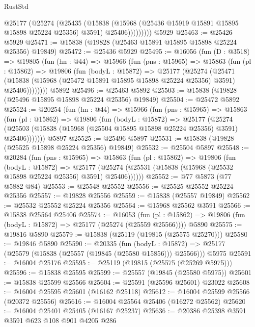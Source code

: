 \begin{lexlean}{RustStd}
\begin{coremodule}
              @25177
                (@25274
                  (@25435
                    (@15838
                      (@15968 (@25436 @15919 @15891 @15895 @15898 @25224 @25356) @3591)
                      @25406)))))))))
    @5929
@25463 := @25426 @5929
@25471 := @15838 (@19828 (@25463 @15891 @15895 @15898 @25224 @25356) @19849)
@25472 := @25436 @5929
@25495 := @16056
    (fun (D : @3518) =>
    @19805
      (fun (hn : @44) =>
      @15966
        (fun (pns : @15965) =>
        @15863
          (fun (pl : @15862) =>
          @19806
            (fun (bodyL : @15872) =>
            @25177
              (@25274
                (@25471
                  (@15838 (@15968 (@25472 @15891 @15895 @15898 @25224 @25356) @3591) @25406))))))))
    @5892
@25496 := @25463 @5892
@25503 := @15838 (@19828 (@25496 @15895 @15898 @25224 @25356) @19849)
@25504 := @25472 @5892
@25524 := @20254
    (fun (hn : @44) =>
    @15966
      (fun (pns : @15965) =>
      @15863
        (fun (pl : @15862) =>
        @19806
          (fun (bodyL : @15872) =>
          @25177
            (@25274
              (@25503 (@15838 (@15968 (@25504 @15895 @15898 @25224 @25356) @3591) @25406)))))))
    @5897
@25525 := @25496 @5897
@25531 := @15838 (@19828 (@25525 @15898 @25224 @25356) @19849)
@25532 := @25504 @5897
@25548 := @20284
    (fun (pns : @15965) =>
    @15863
      (fun (pl : @15862) =>
      @19806
        (fun (bodyL : @15872) =>
        @25177 (@25274 (@25531 (@15838 (@15968 (@25532 @15898 @25224 @25356) @3591) @25406))))))
@25552 := @77 @5873 (@77 @5882 @84)
@25553 := @25548 @25552
@25556 := @25525 @25552 @25224 @25356
@25557 := @19828 @25556
@25559 := @15838 (@25557 @19849)
@25562 := @25532 @25552 @25224 @25356
@25564 := @15968 @25562 @3591
@25566 := @15838 @25564 @25406
@25574 := @16053
    (fun (pl : @15862) => @19806 (fun (bodyL : @15872) => @25177 (@25274 (@25559 @25566))))
    @5890
@25575 := @19816 @5890
@25579 := @15838 (@25119 (@19815 (@25575 @25270)))
@25580 := @19846 @5890
@25590 := @20335
    (fun (bodyL : @15872) => @25177 (@25579 (@15838 (@25557 (@19845 (@25580 @15856))) @25566)))
    @5975
@25591 := @16004 @25176
@25595 := @25119 (@19815 (@25575 (@25269 @5975)))
@25596 := @15838 @25595
@25599 := @25557 (@19845 (@25580 @5975))
@25601 := @15838 @25599 @25566
@25604 := @25591 (@25596 @25601) @23022
@25608 := @16004 @25595 @25601 (@16162 @25118)
@25612 := @16004 @25599 @25566 (@20372 @25556)
@25616 := @16004 @25564 @25406 (@16272 @25562)
@25620 := @16004 @25401 @25405 (@16167 @25237)
@25636 := @20386
    @25398
    @3591
    @3591
    @623
    @108
    @901
    @4205
    @286

\end{coremodule}
\end{lexlean}
